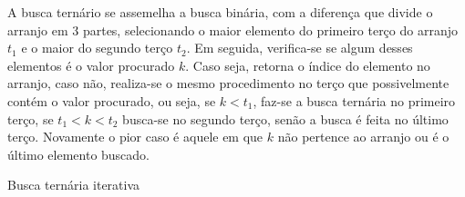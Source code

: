 A busca ternário se assemelha a busca binária, com a diferença que divide o arranjo em 3 partes, selecionando o maior elemento do primeiro terço do arranjo $t_1$ e o maior do segundo terço $t_2$. Em seguida, verifica-se se algum desses elementos é o valor procurado $k$. Caso seja, retorna o índice do elemento no arranjo, caso não, realiza-se o mesmo procedimento no terço que possivelmente contém o valor procurado, ou seja, se $k<t_1$, faz-se a busca ternária no primeiro terço, se $t_1<k<t_2$ busca-se no segundo terço, senão a busca é feita no último terço. Novamente o pior caso é aquele em que $k$ não pertence ao arranjo ou é o último elemento buscado.

\begin{algorithm}[H]
  \DontPrintSemicolon
  \SetAlgoLined
  \caption{Busca ternária iterativa}

  \BlankLine

\end{algorithm}



